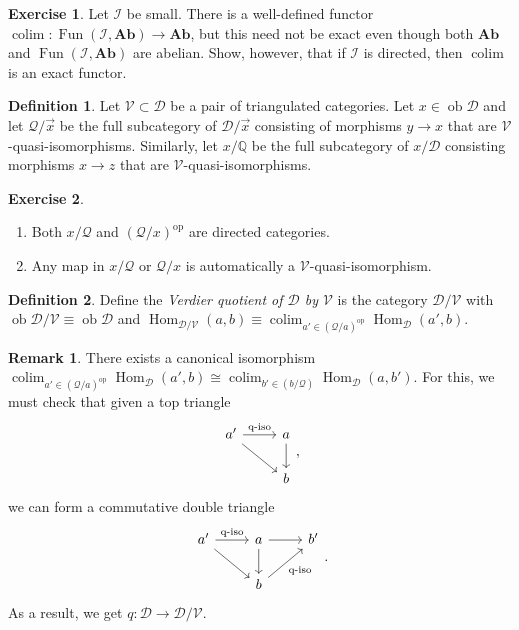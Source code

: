 \documentclass[10pt,letterpaper,cm]{nupset}
\theoremstyle{definition}
\newtheorem*{definition}{Definition}
\newtheorem{remark}{Remark}
\newtheorem{exercise}{Exercise}
\newcommand{\Q}{\mathbb Q}
\newcommand{\1}{\mathbf{1}}
\renewcommand{\d}{\mathscr{D}}
\renewcommand{\i}{\mathscr{I}}
\newcommand{\q}{\mathscr{Q}}
\renewcommand{\v}{\mathscr{V}}
\newcommand{\x}{\vec x}
\newcommand{\0}{\vec 0}
\DeclareMathOperator{\op}{op}
\DeclareMathOperator{\ob}{ob}
\DeclareMathOperator{\Hom}{Hom}
\DeclareMathOperator{\Fun}{Fun}
\DeclareMathOperator{\colim}{colim}
\begin{document}
\begin{exercise}
Let $\i$ be small. There is a well-defined functor $\colim : \Fun(\i, \mathbf{Ab}) \to \mathbf{Ab}$, but this need not be exact even though both $\mathbf{Ab}$ and $\Fun(\i, \mathbf{Ab})$ are abelian. Show, however, that if $\i$ is directed, then $\colim$ is an exact functor. 
\end{exercise}

\begin{definition}
 Let $\v \subset \d$ be a pair of triangulated categories. Let $x \in \ob{\d}$ and let $\q/\x$ be the full subcategory of $\d/\x$ consisting of morphisms $y \to x$ that are $\v$-quasi-isomorphisms. Similarly, let $x/\Q$ be the full subcategory of $x/\d$ consisting morphisms $x \to z$ that are $\v$-quasi-isomorphisms. 
\end{definition}

\begin{exercise} $ $
\begin{enumerate}
\item Both $x/ \q$ and $(\q/x)^{\op}$ are directed categories. 
\item Any map in $x/\q$ or $\q/x$ is automatically a $\v$-quasi-isomorphism. 
\end{enumerate}
\end{exercise}

\begin{definition}
Define the \textit{Verdier quotient of $\d$ by $\v$} is the category $\d/\v$ with $\ob{\d/\v} \equiv \ob{\d}$ and $\Hom_{\d/\v}(a,b) \equiv \colim_{a' \in (\q/a)^{\op}} \Hom_{\d}(a',b)$.
\end{definition}

\begin{remark}
There exists a canonical isomorphism $\colim_{a' \in (\q/a)^{\op}} \Hom_{\d}(a', b) \cong \colim_{b' \in (b/\q)}\Hom_{\d}(a, b')$.  For this, we must check that given a top triangle 
\[
\begin{tikzcd}
a' \arrow[r, "\text{q-iso}"] \arrow[rd] & a \arrow[d] \\
                                        & b          
\end{tikzcd},
\] we can form a commutative double triangle  
\[
\begin{tikzcd}
a' \arrow[r, "\text{q-iso}"] \arrow[rd] & a \arrow[d] \arrow[r]         & b' \\
                                        & b \arrow[ru, "\text{q-iso}"'] &   
\end{tikzcd}
.\]
As a result, we get $q: \d \to \d/\v$.
\end{remark}
\end{document}
